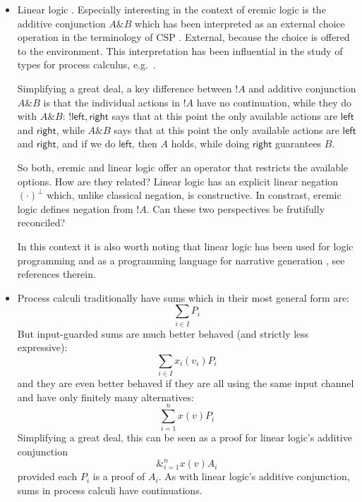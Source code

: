 \begin{itemize}

\item Linear logic \cite{GirardJY:linlog,GirardJY:protyp}. Especially
  interesting in the context of eremic logic is the additive
  conjunction $A \& B$ which has been interpreted
  \cite{AbramskyS:comintoll} as an external choice operation in the
  terminology of CSP \cite{HoareC:comseq}. External, because the
  choice is offered to the environment. This interpretation has been
  influential in the study of types for process calculus,
  e.g.~\cite{HondaK:unitypsfsifLONG,TakeuchiK:intbaslaits,HondaK:lanpriatdfscbp}. 

  Simplifying a great deal, a key difference between $!A$ and additive
  conjunction $A \& B$ is that the individual actions in $!A$ have no
  continuation, while they do with $A \& B$: $!{\mathsf{left},
    \mathsf{right}}$ says that at this point the only available
  actions are $\mathsf{left}$ and $\mathsf{right}$, while $A \& B$
  says that at this point the only available actions are
  $\mathsf{left}$ and $\mathsf{right}$, and if we do $\mathsf{left}$,
  then $A$ holds, while doing $\mathsf{right}$ guarantees $B$.

  So both, eremic and linear logic offer an operator that restricts
  the available options. How are they related? Linear logic has an
  explicit linear negation $(\cdot)^{\bot}$ which, unlike classical
  negation, is constructive. In constrast, eremic logic defines
  negation from $!A$. Can these two perspectives be frutifully
  reconciled?

  In this context it is also worth noting that linear logic has been
  used for logic programming
  \cite{HodasJS:logproiafoill,WinikoffMD:logprowll,PymDJ:uniprotiollp,HarlandJ:prolygao,MillerD:surlinlp}
  and as a programming language for narrative generation
  \cite{BosserAG:linlogpfng}, see references therein.


\item Process calculi traditionally 
  have sums which in their most general form are:
  \[
     \sum_{i \in I} P_i
  \]
  But input-guarded sums are much better behaved (and strictly less
  expressive):
  \[
     \sum_{i \in I} x_{i}(v_i)P_i
  \]
  and they are even better behaved if they are all using the same
  input channel and have only finitely many alternatives:
  \[
     \sum_{i = 1}^n x(v)P_i
  \]
  Simplifying a great deal, this can be seen as a proof for linear
  logic's additive conjunction
  \[
     \&_{i = 1}^n x(v)A_i
  \]
  provided each $P_i$ is a proof of $A_i$.  As with linear logic's
  additive conjunction, sums in process calculi have continuations.
  
\end{itemize}


